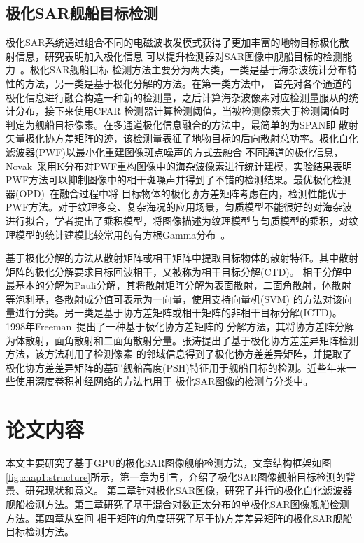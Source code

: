   \subsection{极化SAR舰船目标检测}
      极化SAR系统通过组合不同的电磁波收发模式获得了更加丰富的地物目标极化散射信息，研究表明加入极化信息
      可以提升检测器对SAR图像中舰船目标的检测能力~\cite{18677,Touzi2015Optimization}。极化SAR舰船目标
      检测方法主要分为两大类，一类是基于海杂波统计分布特性的方法，另一类是基于极化分解的方法。在第一类方法中，
      首先对各个通道的极化信息进行融合构造一种新的检测量，之后计算海杂波像素对应检测量服从的统计分布，接下来使用CFAR
      检测器计算检测阈值，当被检测像素大于检测阈值时判定为舰船目标像素。在多通道极化信息融合的方法中，最简单的为SPAN即
      散射矢量极化协方差矩阵的迹，该检测量表征了地物目标的后向散射总功率。极化白化滤波器(PWF)以最小化重建图像斑点噪声的方式去融合
      不同通道的极化信息，Novak~\cite{Novak1990Optimal}采用K分布对PWF重构图像中的海杂波像素进行统计建模，实验结果表明
      PWF方法可以抑制图像中的相干斑噪声并得到了不错的检测结果。最优极化检测器(OPD)~\cite{18677}在融合过程中将
      目标物体的极化协方差矩阵考虑在内，检测性能优于PWF方法。对于纹理多变、复杂海况的应用场景，匀质模型不能很好的对海杂波
      进行拟合，学者提出了乘积模型，将图像描述为纹理模型与匀质模型的乘积，对纹理模型的统计建模比较常用的有方根Gamma分布~\cite{Lee1994K}。

      基于极化分解的方法从散射矩阵或相干矩阵中提取目标物体的散射特征。其中散射矩阵的极化分解要求目标回波相干，又被称为相干目标分解(CTD)。
      相干分解中最基本的分解为Pauli分解，其将散射矩阵分解为表面散射，二面角散射，体散射等泡利基，各散射成分值可表示为一向量，使用支持向量机(SVM)
      的方法对该向量进行分类。另一类是基于协方差矩阵或相干矩阵的非相干目标分解(ICTD)。1998年Freeman~\cite{673687}提出了一种基于极化协方差矩阵的
      分解方法，其将协方差阵分解为体散射，面角散射和二面角散射分量。张涛\cite{Tao2017PolSAR}提出了基于极化协方差差异矩阵检测方法，该方法利用了检测像素
      的邻域信息得到了极化协方差差异矩阵，并提取了极化协方差差异矩阵的基础舰船高度(PSH)特征用于舰船目标的检测。近些年来一些使用深度卷积神经网络的方法也用于
      极化SAR图像的检测与分类中。


\section{论文内容}
  本文主要研究了基于GPU的极化SAR图像舰船检测方法，文章结构框架如图\ref{fig:chap1:structure}所示，第一章为引言，介绍了极化SAR图像舰船目标检测的背景、研究现状和意义。
  第二章针对极化SAR图像，研究了并行的极化白化滤波器舰船检测方法。第三章研究了基于混合对数正太分布的单极化SAR图像舰船检测方法。第四章从空间
  相干矩阵的角度研究了基于协方差差异矩阵的极化SAR舰船目标检测方法。


